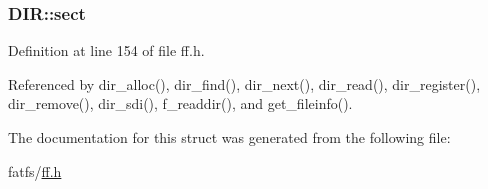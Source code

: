 \subsubsection[{\texorpdfstring{sect}{sect}}]{ D\+I\+R\+::sect}\hypertarget{structDIR_ad01fcc812ed0dad11a593574336adc9e}{}\label{structDIR_ad01fcc812ed0dad11a593574336adc9e}


Definition at line 154 of file ff.\+h.



Referenced by dir\+\_\+alloc(), dir\+\_\+find(), dir\+\_\+next(), dir\+\_\+read(), dir\+\_\+register(), dir\+\_\+remove(), dir\+\_\+sdi(), f\+\_\+readdir(), and get\+\_\+fileinfo().



The documentation for this struct was generated from the following file\+:\begin{DoxyCompactItemize}
\item 
fatfs/\hyperlink{ff_8h}{ff.\+h}\end{DoxyCompactItemize}
